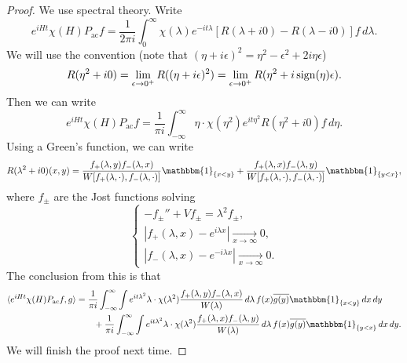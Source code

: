 \begin{proof}
  We use spectral theory. Write
  \[
    e^{iHt} \chi(H) P_{\mathrm{ac}} f
    = \frac{1}{2\pi i} \int_0^\infty \chi(\lambda) e^{-it\lambda} [R(\lambda + i0) - R(\lambda - i0)] f\, d\lambda.
  \]
  We will use the convention (note that
  $(\eta + i\epsilon)^2 = \eta^2 - \epsilon^2 + 2i\eta \epsilon$)
  \[
    R(\eta^2 + i 0) = \lim_{\epsilon \to 0^+} R((\eta + i\epsilon)^2)
    = \lim_{\epsilon \to 0^+} R(\eta^2 + i \operatorname{sign} (\eta) \epsilon).
  \]
  Then we can write
  \[
    e^{iHt} \chi(H) P_{\mathrm{ac}} f
    = \frac{1}{\pi i} \int_{-\infty}^\infty \eta \cdot \chi(\eta^2) e^{it\eta^2} R(\eta^2 + i0) f\, d\eta.
  \]
  Using a Green's function, we can write
  \[
    R(\lambda^2 + i 0)(x, y)
    = \frac{f_+(\lambda, y)f_-(\lambda, x)}{W[f_+(\lambda, \cdot), f_-(\lambda, \cdot)]} \mathbbm{1}_{\{x < y\}}
    + \frac{f_+(\lambda, x)f_-(\lambda, y)}{W[f_+(\lambda, \cdot), f_-(\lambda, \cdot)]} \mathbbm{1}_{\{y < x\}},
  \]
  where $f_{\pm}$ are the Jost functions solving
  \[
    \begin{cases}
      -f_{\pm}'' + V f_{\pm} = \lambda^2 f_{\pm}, \\
      |f_+(\lambda, x) - e^{i\lambda x}| \xrightarrow[x \to \infty]{} 0, \\
      |f_-(\lambda, x) - e^{-i\lambda x}| \xrightarrow[x \to \infty]{} 0.
    \end{cases}
  \]
  The conclusion from this is that
  \begin{align*}
    \langle e^{iHt} \chi(H) P_{\mathrm{ac}} f, g \rangle
    &=
    \frac{1}{\pi i} \int_{-\infty}^\infty
    \int e^{it \lambda^2} \lambda \cdot  \chi(\lambda^2)
    \frac{f_+(\lambda, y) f_-(\lambda, x)}{W(\lambda)}\, d\lambda\, f(x) \overline{g(y)} \mathbbm{1}_{\{x < y\}}\, dx\, dy \\
    & \quad \quad +
    \frac{1}{\pi i} \int_{-\infty}^\infty
    \int e^{it \lambda^2} \lambda \cdot  \chi(\lambda^2)
    \frac{f_+(\lambda, x) f_-(\lambda, y)}{W(\lambda)}\, d\lambda\, f(x) \overline{g(y)} \mathbbm{1}_{\{y < x\}}\, dx\, dy.
  \end{align*}
  We will finish the proof next time.
\end{proof}
